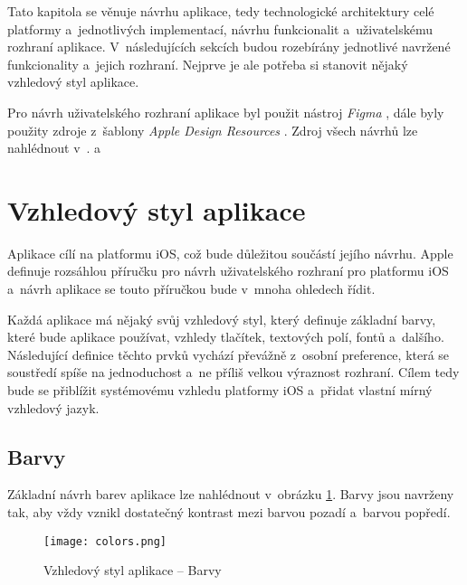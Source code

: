Tato kapitola se věnuje návrhu aplikace, tedy technologické architektury celé platformy a~jednotlivých implementací, návrhu funkcionalit a~uživatelskému rozhraní aplikace. V~následujících sekcích budou rozebírány jednotlivé navržené funkcionality a~jejich rozhraní. Nejprve je ale potřeba si stanovit nějaký vzhledový styl aplikace.

Pro návrh uživatelského rozhraní aplikace byl použit nástroj \emph{Figma} \cite{figma}, dále byly použity zdroje z~šablony \emph{Apple Design Resources} \cite{apple-design-resources}. Zdroj všech návrhů lze nahlédnout v~\cite{trackee-app-figma}.
 a~
\section{Vzhledový styl aplikace}

Aplikace cílí na platformu iOS, což bude důležitou součástí jejího návrhu. Apple definuje rozsáhlou příručku pro návrh uživatelského rozhraní pro platformu iOS \cite{apple-design-guidelines-ios} a~návrh aplikace se touto příručkou bude v~mnoha ohledech řídit.

Každá aplikace má nějaký svůj vzhledový styl, který definuje základní barvy, které bude aplikace používat, vzhledy tlačítek, textových polí, fontů a~dalšího. Následující definice těchto prvků vychází převážně z~osobní preference, která se soustředí spíše na jednoduchost a~ne příliš velkou výraznost rozhraní. Cílem tedy bude se přiblížit systémovému vzhledu platformy iOS a~přidat vlastní mírný vzhledový jazyk.

\subsection{Barvy}

Základní návrh barev aplikace lze nahlédnout v~obrázku \ref{fig:colors}. Barvy jsou navrženy tak, aby vždy vznikl dostatečný kontrast mezi barvou pozadí a~barvou popředí.

\begin{figure}[h]
	\centering
	\texttt{[image: colors.png]}
	\caption{Vzhledový styl aplikace – Barvy}
	\label{fig:colors}
\end{figure}

